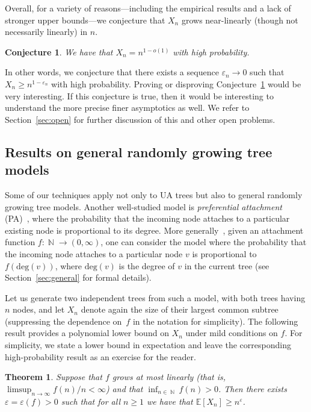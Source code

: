 \documentclass[11pt]{article}
\numberwithin{equation}{section}
\DeclareMathOperator{\N}{\mathbb{N}} %
\newcommand{\E}{\mathbb{E}} %
\newcommand{\eps}{\varepsilon} %
\newtheorem{theorem}{Theorem}[section]
\newtheorem{conjecture}{Conjecture}[section]
\theoremstyle{definition}
\begin{document}
Overall, for a variety of reasons---including the empirical results and a lack of stronger upper bounds---we conjecture that $X_{n}$ grows near-linearly (though not necessarily linearly) in $n$. 

\begin{conjecture}\label{conj:asymptotics}
We have that $X_{n} = n^{1-o(1)}$ with high probability. 
\end{conjecture}

In other words, we conjecture that there exists a sequence $\eps_{n} \to 0$ such that $X_{n} \geq n^{1-\eps_{n}}$ with high probability. 
Proving or disproving Conjecture~\ref{conj:asymptotics} would be very interesting. If this conjecture is true, then it would be interesting to understand the more precise finer asymptotics as well. 
We refer to Section~\ref{sec:open} for further discussion of this and other open problems. 


\subsection{Results on general randomly growing tree models} \label{sec:results_general}


Some of our techniques apply not only to UA trees but also to general randomly growing tree models. 
Another well-studied model is \emph{preferential attachment} (PA)~\cite{Mah92,BA99,BRST01}, 
where the probability that the incoming node attaches to a particular existing node is proportional to its degree. 
More generally~\cite{RTV07}, given an attachment function 
$f: \N \to (0,\infty)$, 
one can consider the model where the probability that the incoming node attaches to a particular node $v$ is proportional to 
$f(\mathrm{deg}(v))$, 
where $\mathrm{deg}(v)$ is the degree of $v$ in the current tree (see Section~\ref{sec:general} for formal details). 

Let us generate two independent trees from such a model, with both trees having $n$ nodes, 
and let $X_{n}$ denote again the size of their largest common subtree 
(suppressing the dependence on~$f$ in the notation for simplicity). 
The following result provides a polynomial lower bound on $X_{n}$ under mild conditions on $f$. 
For simplicity, we state a lower bound in expectation and leave the corresponding high-probability result as an exercise for the reader. 

\begin{theorem}\label{thm:general_lb} %
Suppose that $f$ grows at most linearly (that is, $\limsup_{n\to\infty} f(n) / n < \infty$) and that $\inf_{n\in \N} f(n)>0$. Then there exists $\eps = \eps(f) >0$ such that for all $n \geq 1$ we have that $\E \left[ X_n \right] \geq n^\eps$.
\end{theorem}
\end{document}

